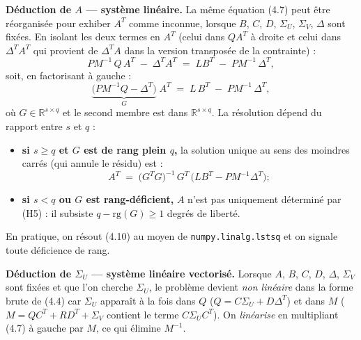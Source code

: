 \documentclass[12pt, a4paper]{article}
\begin{document}
{\medskip
\noindent\textbf{Déduction de $A$ — système linéaire.}
La même équation (4.7) peut être réorganisée pour exhiber $A^T$ comme inconnue, lorsque
$B$, $C$, $D$, $\Sigma_U$, $\Sigma_V$, $\Delta$ sont fixées. En isolant les deux termes
en $A^T$ (celui dans $QA^T$ à droite et celui dans $\Delta^T A^T$ qui provient de $\Delta^T A$
dans la version transposée de la contrainte) :
\begin{equation}
  P M^{-1}\,Q\,A^T \;-\; \Delta^T A^T
  \;=\; L B^T \;-\; P M^{-1}\,\Delta^T,
  \tag{4.9}
\end{equation}
soit, en factorisant à gauche :
\begin{equation}
  \underbrace{\bigl(P M^{-1} Q - \Delta^T\bigr)}_{\displaystyle G}\; A^T
  \;=\; L\,B^T \;-\; P M^{-1}\,\Delta^T,
  \tag{4.10}
\end{equation}
où $G \in \mathbb{R}^{s \times q}$ et le second membre est dans $\mathbb{R}^{s \times q}$.
La résolution dépend du rapport entre $s$ et $q$ :
\begin{itemize}
  \item \textbf{si $s \geq q$ et $G$ est de rang plein $q$,} la solution unique au sens
    des moindres carrés (qui annule le résidu) est :
    \begin{equation}
      \boxed{A^T \;=\; \bigl(G^T G\bigr)^{-1}\,G^T\,\bigl(L B^T - P M^{-1} \Delta^T\bigr) ;}
      \tag{4.11}
    \end{equation}
  \item \textbf{si $s < q$ ou $G$ est rang-déficient,} $A$ n'est pas uniquement déterminé
    par (H5) : il subsiste $q - \mathrm{rg}(G) \geq 1$ degrés de liberté.
\end{itemize}
En pratique, on résout (4.10) au moyen de \texttt{numpy.linalg.lstsq} et on signale
toute déficience de rang.

\medskip
\noindent\textbf{Déduction de $\Sigma_U$ — système linéaire vectorisé.}
Lorsque $A$, $B$, $C$, $D$, $\Delta$, $\Sigma_V$ sont fixées et que l'on cherche $\Sigma_U$,
le problème devient \emph{non linéaire} dans la forme brute de (4.4) car $\Sigma_U$
apparaît à la fois dans $Q$ ($Q = C\Sigma_U + D\Delta^T$) et dans $M$
($M = QC^T + RD^T + \Sigma_V$ contient le terme $C\Sigma_U C^T$). On
\emph{linéarise} en multipliant (4.7) à gauche par $M$, ce qui élimine $M^{-1}$.

}
\end{document}
